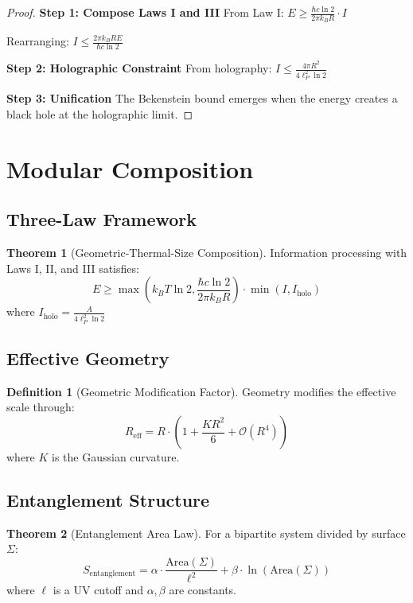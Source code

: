 \documentclass[11pt,a4paper]{article}
\theoremstyle{definition}
\newtheorem{definition}{Definition}[section]
\newtheorem{theorem}{Theorem}[section]
\begin{document}
\begin{proof}
\textbf{Step 1: Compose Laws I and III}
From Law I: $E \geq \frac{\hbar c \ln 2}{2\pi k_B R} \cdot I$

Rearranging: $I \leq \frac{2\pi k_B R E}{\hbar c \ln 2}$

\textbf{Step 2: Holographic Constraint}
From holography: $I \leq \frac{4\pi R^2}{4\ell_P^2 \ln 2}$

\textbf{Step 3: Unification}
The Bekenstein bound emerges when the energy creates a black hole at the holographic limit.
\end{proof}

\section{Modular Composition}

\subsection{Three-Law Framework}

\begin{theorem}[Geometric-Thermal-Size Composition]
Information processing with Laws I, II, and III satisfies:
\begin{equation}
E \geq \max\left(k_B T \ln 2, \frac{\hbar c \ln 2}{2\pi k_B R}\right) \cdot \min(I, I_{\text{holo}})
\end{equation}
where $I_{\text{holo}} = \frac{A}{4\ell_P^2 \ln 2}$
\end{theorem}

\subsection{Effective Geometry}

\begin{definition}[Geometric Modification Factor]
Geometry modifies the effective scale through:
\begin{equation}
R_{\text{eff}} = R \cdot \left(1 + \frac{K R^2}{6} + \mathcal{O}(R^4)\right)
\end{equation}
where $K$ is the Gaussian curvature.
\end{definition}

\subsection{Entanglement Structure}

\begin{theorem}[Entanglement Area Law]
For a bipartite system divided by surface $\Sigma$:
\begin{equation}
S_{\text{entanglement}} = \alpha \cdot \frac{\text{Area}(\Sigma)}{\ell^2} + \beta \cdot \ln(\text{Area}(\Sigma))
\end{equation}
where $\ell$ is a UV cutoff and $\alpha, \beta$ are constants.
\end{theorem}
\end{document}
